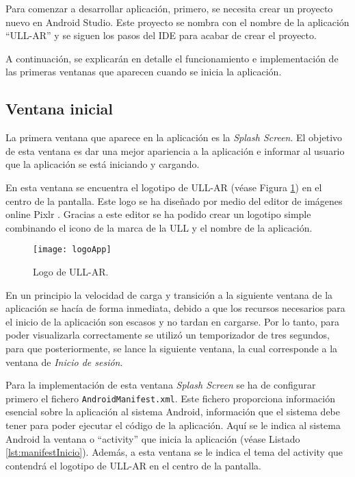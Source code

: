 Para comenzar a desarrollar aplicación, primero, se necesita crear un proyecto nuevo en Android Studio. Este proyecto se nombra con el nombre de la aplicación ``ULL-AR'' y se siguen los pasos del IDE para acabar de crear el proyecto. 

A continuación, se explicarán en detalle el funcionamiento e implementación de las primeras ventanas que aparecen cuando se inicia la aplicación. 

\subsection{Ventana inicial}

La primera ventana que aparece en la aplicación es la \textit{Splash Screen}. El objetivo de esta ventana es dar una mejor apariencia a la aplicación e informar al usuario que la aplicación se está iniciando y cargando. 

En esta ventana se encuentra el logotipo de ULL-AR (véase Figura \ref{fig:logoApp}) en el centro de la pantalla. Este logo se ha diseñado por medio del editor de imágenes online Pixlr \cite{URL::pixlr}. Gracias a este editor se ha podido crear un logotipo simple combinando el icono de la marca de la ULL y el nombre de la aplicación.
 
\begin{figure}[h]
    \centering
    \texttt{[image: logoApp]}
    \caption{Logo de ULL-AR.}
    \label{fig:logoApp}
\end{figure}    
 

En un principio la velocidad de carga y transición a la siguiente ventana de la aplicación se hacía de forma inmediata, debido a que los recursos necesarios para el inicio de la aplicación son escasos y no tardan en cargarse. Por lo tanto, para poder visualizarla correctamente se utilizó un temporizador de tres segundos, para que posteriormente, se lance la siguiente ventana, la cual corresponde a la ventana de \textit{Inicio de sesión}.

Para la implementación de esta ventana \textit{Splash Screen} se ha de configurar primero el fichero \texttt{AndroidManifest.xml}. Este fichero proporciona información esencial sobre la aplicación al sistema Android, información que el sistema debe tener para poder ejecutar el código de la aplicación. Aquí se le indica al sistema Android la ventana o ``activity'' \cite{URL::activity} que inicia la aplicación (véase Listado \ref{lst:manifestInicio}). Además, a esta ventana se le indica el tema del activity que contendrá el logotipo de ULL-AR en el centro de la pantalla.

